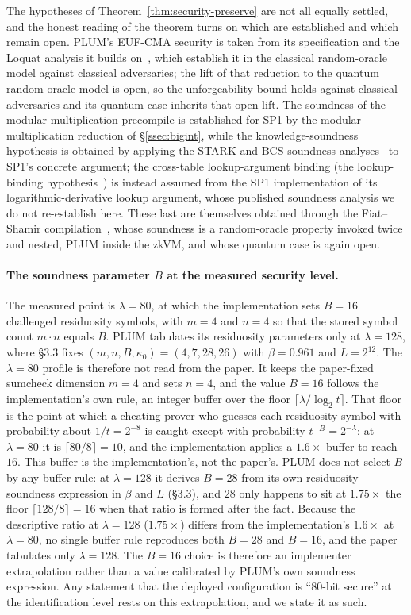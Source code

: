 The hypotheses of Theorem~\ref{thm:security-preserve} are not all equally settled, and the honest reading of the theorem turns on which are established and which remain open. PLUM's EUF-CMA security is taken from its specification and the Loquat analysis it builds on~\cite{cryptoeprint:2024/868}, which establish it in the classical random-oracle model against classical adversaries; the lift of that reduction to the quantum random-oracle model is open, so the unforgeability bound holds against classical adversaries and its quantum case inherits that open lift. The soundness of the modular-multiplication precompile is established for SP1 by the modular-multiplication reduction of \S\ref{ssec:bigint}, while the knowledge-soundness hypothesis is obtained by applying the STARK and BCS soundness analyses~\cite{bensasson2016iop} to SP1's concrete argument; the cross-table lookup-argument binding (the lookup-binding hypothesis~\cite{haback2022logup}) is instead assumed from the SP1 implementation of its logarithmic-derivative lookup argument, whose published soundness analysis we do not re-establish here. These last are themselves obtained through the Fiat--Shamir compilation~\cite{fiatshamir1986}, whose soundness is a random-oracle property invoked twice and nested, PLUM inside the zkVM, and whose quantum case is again open.

\paragraph{The soundness parameter $B$ at the measured security level.}
The measured point is $\lambda=80$, at which the implementation sets $B=16$ challenged residuosity symbols, with $m=4$ and $n=4$ so that the stored symbol count $m\cdot n$ equals $B$. PLUM tabulates its residuosity parameters only at $\lambda=128$, where \S3.3 fixes $(m,n,B,\kappa_0)=(4,7,28,26)$ with $\beta=0.961$ and $L=2^{12}$. The $\lambda=80$ profile is therefore not read from the paper. It keeps the paper-fixed sumcheck dimension $m=4$ and sets $n=4$, and the value $B=16$ follows the implementation's own rule, an integer buffer over the floor $\lceil\lambda/\log_2 t\rceil$. That floor is the point at which a cheating prover who guesses each residuosity symbol with probability about $1/t=2^{-8}$ is caught except with probability $t^{-B}=2^{-\lambda}$: at $\lambda=80$ it is $\lceil80/8\rceil=10$, and the implementation applies a $1.6\times$ buffer to reach $16$. This buffer is the implementation's, not the paper's. PLUM does not select $B$ by any buffer rule: at $\lambda=128$ it derives $B=28$ from its own residuosity-soundness expression in $\beta$ and $L$ (\S3.3), and $28$ only happens to sit at $1.75\times$ the floor $\lceil128/8\rceil=16$ when that ratio is formed after the fact. Because the descriptive ratio at $\lambda=128$ ($1.75\times$) differs from the implementation's $1.6\times$ at $\lambda=80$, no single buffer rule reproduces both $B=28$ and $B=16$, and the paper tabulates only $\lambda=128$. The $B=16$ choice is therefore an implementer extrapolation rather than a value calibrated by PLUM's own soundness expression. Any statement that the deployed configuration is ``$80$-bit secure'' at the identification level rests on this extrapolation, and we state it as such.


